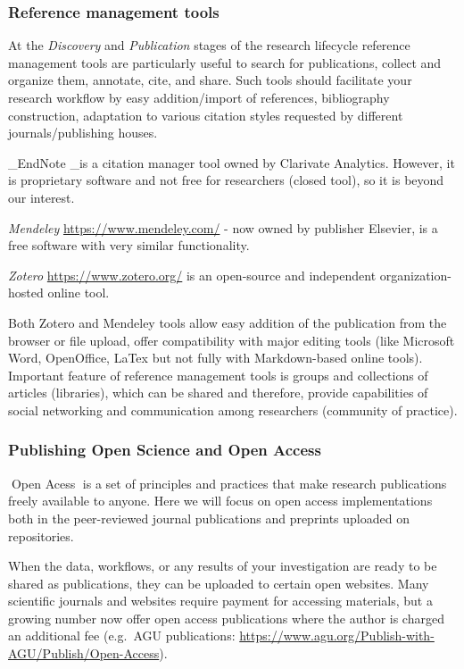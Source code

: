 \documentclass[
  letterpaper,
  DIV=11,
  numbers=noendperiod]{scrreport}
\begin{document}
\hypertarget{reference-management-tools}{%
\subsubsection{Reference management
tools}\label{reference-management-tools}}

At the \emph{Discovery} and \emph{Publication} stages of the research
lifecycle reference management tools are particularly useful to search
for publications, collect and organize them, annotate, cite, and share.
Such tools should facilitate your research workflow by easy
addition/import of references, bibliography construction, adaptation to
various citation styles requested by different journals/publishing
houses.

\_EndNote \_is a citation manager tool owned by Clarivate Analytics.
However, it is proprietary software and not free for researchers (closed
tool), so it is beyond our interest.

\emph{Mendeley} \url{https://www.mendeley.com/} - now owned by publisher
Elsevier, is a free software with very similar functionality.

\emph{Zotero} \url{https://www.zotero.org/} is an open-source and
independent organization-hosted online tool.

Both Zotero and Mendeley tools allow easy addition of the publication
from the browser or file upload, offer compatibility with major editing
tools (like Microsoft Word, OpenOffice, LaTex but not fully with
Markdown-based online tools). Important feature of reference management
tools is groups and collections of articles (libraries), which can be
shared and therefore, provide capabilities of social networking and
communication among researchers (community of practice).

\hypertarget{publishing-open-science-and-open-access-1}{%
\subsubsection{Publishing Open Science and Open
Access}\label{publishing-open-science-and-open-access-1}}

{📖}Open Acess{📖} is a set of principles and practices that make
research publications freely available to anyone. Here we will focus on
open access implementations both in the peer-reviewed journal
publications and preprints uploaded on repositories.

When the data, workflows, or any results of your investigation are ready
to be shared as publications, they can be uploaded to certain open
websites. Many scientific journals and websites require payment for
accessing materials, but a growing number now offer open access
publications where the author is charged an additional fee (e.g.~AGU
publications:
\url{https://www.agu.org/Publish-with-AGU/Publish/Open-Access}).
\end{document}
